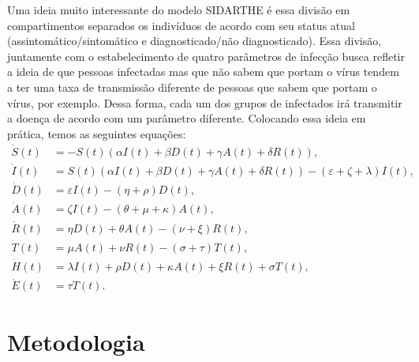 \documentclass{article}
\begin{document}
Uma ideia muito interessante do modelo SIDARTHE é essa divisão em compartimentos separados os indivíduos de acordo com seu status atual (assintomático/sintomático e diagnosticado/não diagnosticado). Essa divisão, juntamente com o estabelecimento de quatro parâmetros de infecção busca refletir a ideia de que pessoas infectadas mas que não sabem que portam o vírus tendem a ter uma taxa de transmissão diferente de pessoas que sabem que portam o vírus, por exemplo. Dessa forma, cada um dos grupos de infectados irá transmitir a doença de acordo com um parâmetro diferente. Colocando essa ideia em prática, temos as seguintes equações:
\begin{equation*}
    \begin{split}
        \dot{S}(t) & = -S(t)(\alpha I(t) + \beta D(t) + \gamma A(t) + \delta R(t)),\\
        \dot{I}(t) & = S(t)(\alpha I(t) + \beta D(t) + \gamma A(t) + \delta R(t)) - (\varepsilon + \zeta + \lambda)I(t), \\
        \dot{D}(t) & = \varepsilon I(t) - (\eta + \rho)D(t), \\
        \dot{A}(t) & = \zeta I(t) - (\theta + \mu + \kappa)A(t), \\
        \dot{R}(t) & = \eta D(t) + \theta A(t) - (\nu + \xi)R(t), \\
        \dot{T}(t) & = \mu A(t) + \nu R(t) - (\sigma + \tau)T(t), \\
        \dot{H}(t) & = \lambda I(t) + \rho D(t) + \kappa A(t) + \xi R(t) + \sigma T(t), \\
        \dot{E}(t) & = \tau T(t).
    \end{split}
\end{equation*}





\cite{fSEIRD}


\section{Metodologia}



\printbibliography
\end{document}
